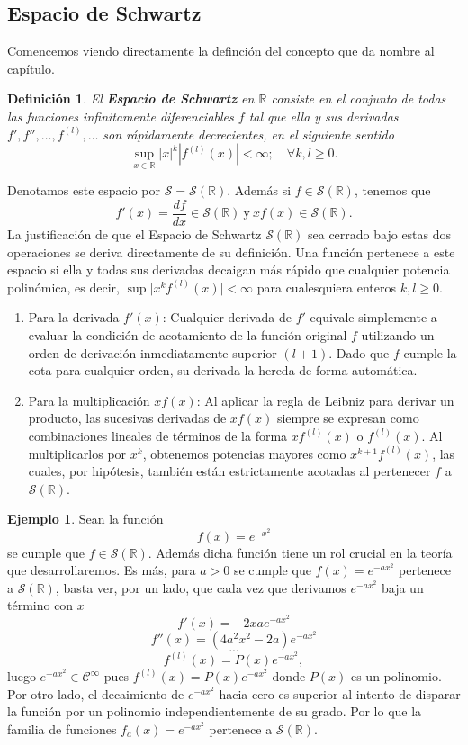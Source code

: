 \documentclass[12pt]{article}
\newcommand{\R}{\mathbb{R}}
\newcommand{\Sc}{\mathcal{S}(\mathbb{R})}
\theoremstyle{plain}
\newtheorem{definicion}[teorema]{\textbf{Definición}}
\theoremstyle{definition}
\newtheorem{ejemplo}[teorema]{Ejemplo}
\numberwithin{equation}{section}
\begin{document}
        \subsection{Espacio de Schwartz}
            Comencemos viendo directamente la definción del concepto que da nombre al capítulo.
            \begin{definicion}
                El \textbf{Espacio de Schwartz} en \(\R\) consiste en el conjunto de todas las funciones infinitamente diferenciables \(f\) tal que ella y sus derivadas \(f',f'',\dots, f^{(l)},\dots\) son rápidamente decrecientes, en el siguiente sentido
                $$ \sup_{x \in \R} \left\lvert x\right\rvert^k \left\lvert f^{(l)}(x)\right\rvert < \infty; \quad \forall k,l \geq 0.$$
            \end{definicion}
            Denotamos este espacio por \(\mathcal{S} = \Sc\). Además si \(f \in \Sc\), tenemos que
            $$ f'(x) = \frac{df}{dx} \in \Sc\ \text{y}\ xf(x) \in \Sc.$$ 
            La justificación de que el Espacio de Schwartz $\mathcal{S}(\mathbb{R})$ sea cerrado bajo estas dos operaciones se deriva directamente de su definición. Una función pertenece a este espacio si ella y todas sus derivadas decaigan más rápido que cualquier potencia polinómica, es decir, $\sup \vert{}x^k f^{(l)}(x)\vert{} < \infty$ para cualesquiera enteros $k, l \ge 0$.
            \begin{enumerate}
                \item Para la derivada $f'(x)$: Cualquier derivada de $f'$ equivale simplemente a evaluar la condición de acotamiento de la función original $f$ utilizando un orden de derivación inmediatamente superior $(l + 1)$. Dado que $f$ cumple la cota para cualquier orden, su derivada la hereda de forma automática.
                \item Para la multiplicación $xf(x)$: Al aplicar la regla de Leibniz para derivar un producto, las sucesivas derivadas de $xf(x)$ siempre se expresan como combinaciones lineales de términos de la forma $x f^{(l)}(x)$ o $f^{(l)}(x)$. Al multiplicarlos por $x^k$, obtenemos potencias mayores como $x^{k+1} f^{(l)}(x)$, las cuales, por hipótesis, también están estrictamente acotadas al pertenecer $f$ a $\mathcal{S}(\mathbb{R})$.
            \end{enumerate}
            \begin{ejemplo}
                Sean la función $$f(x) = e^{-x^2}$$ se cumple que \(f \in \Sc\). Además dicha función tiene un rol crucial en la teoría que desarrollaremos.
                Es más, para \(a > 0\) se cumple que \(f(x) = e^{-ax^2}\) pertenece a \(\Sc\), basta ver, por un lado, que cada vez que derivamos \(e^{-ax^2}\) baja un término con \(x\) $$ f'(x) = -2xae^{-ax^2}$$ $$f''(x) = (4a^2x^2 - 2a)e^{-ax^2}$$ $$...$$ $$ f^{(l)}(x) = P(x)e^{-ax^2}, $$ luego \(e^{-ax^2} \in \mathcal{C}^\infty\) pues \(f^{(l)}(x) = P(x)e^{-ax^2}\) donde \(P(x)\) es un polinomio. Por otro lado, el decaimiento de \(e^{-ax^2}\) hacia cero es superior al intento de disparar la función por un polinomio independientemente de su grado. Por lo que la familia de funciones \(f_a (x) = e^{-ax^2}\) pertenece a \(\Sc\).
            \end{ejemplo}
\end{document}

